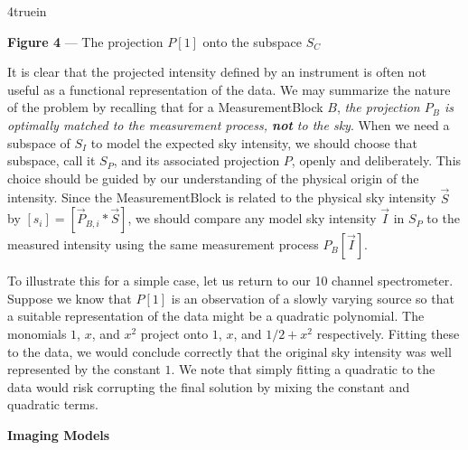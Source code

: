 \epsfxsize 4truein
\centerline {}
\centerline {{\bf Figure 4} --- The projection $P[1]$ onto the subspace $S_C$}

It is clear that the projected intensity defined by an instrument is often
not useful as a functional 
representation of the data. We may summarize the nature of the problem by 
recalling that for a MeasurementBlock $B$, {\it the projection $P_B$ is 
optimally 
matched to the measurement process, {\bf not} to the sky}. When we need a
subspace of $S_I$ to model the expected sky intensity, we should choose that 
subspace, call it $S_P$, and its associated projection $P$, openly and 
deliberately. This choice should
be guided by our understanding of the physical origin of the intensity. Since
the MeasurementBlock is related to the physical sky intensity $\vec S$ by 
$[s_i] = [\vec P_{B,i} \ast \vec S]$, we should compare any model sky 
intensity $\vec I$ in $S_P$ to the measured intensity using the same 
measurement process $P_B[\vec I]$.

To illustrate this for a simple case, let us return to our 10 channel 
spectrometer. Suppose we know that $P[1]$ is an observation of a slowly 
varying source so that a suitable representation of the data might be a
quadratic polynomial. The monomials $1$, $x$, and $x^2$ project onto
$1$, $x$, and $1/2+x^2$ respectively. Fitting these to the data, we would 
conclude correctly that the original sky intensity was well represented by 
the constant $1$. We note that simply fitting a quadratic to the data
would risk corrupting the final solution by mixing the constant and quadratic
terms.

\medskip
\centerline{\bf Imaging Models}

